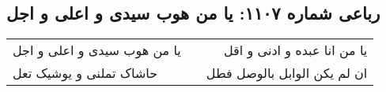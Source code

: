 \begin{center}
\section*{رباعی شماره ۱۱۰۷: یا من هوب سیدی و اعلی و اجل}
\label{sec:1107}
\begin{longtable}{l p{0.5cm} r}
یا من هوب سیدی و اعلی و اجل
&&
یا من انا عبده و ادنی و اقل
\\
حاشاک تملنی و یوشیک تعل
&&
ان لم یکن الوابل بالوصل فطل
\\
\end{longtable}
\end{center}
